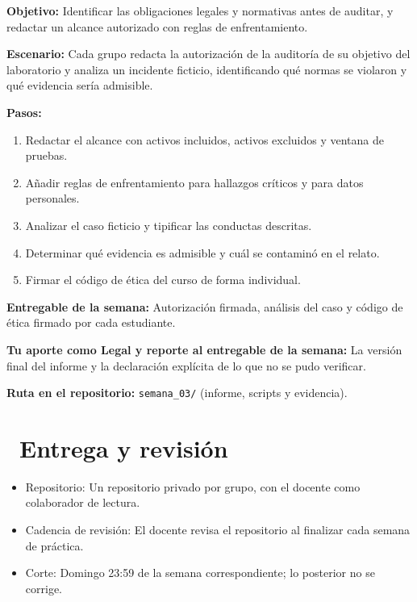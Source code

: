 \documentclass[11pt,a4paper]{article}
\newcommand{\iconotexto}[2]{\textcolor{cyanNeon}{\faIcon{#1}}~#2}
\begin{document}
\begin{tcolorbox}[cajaContenido,title={Semana 3 --- Carta de autorización y análisis de caso}]
\textbf{Objetivo:} Identificar las obligaciones legales y normativas antes de auditar, y redactar un alcance autorizado con reglas de enfrentamiento.

\textbf{Escenario:} Cada grupo redacta la autorización de la auditoría de su objetivo del laboratorio y analiza un incidente ficticio, identificando qué normas se violaron y qué evidencia sería admisible.


\textbf{Pasos:}
\begin{enumerate}[leftmargin=1.4em,itemsep=2pt,topsep=3pt]
  \item Redactar el alcance con activos incluidos, activos excluidos y ventana de pruebas.
  \item Añadir reglas de enfrentamiento para hallazgos críticos y para datos personales.
  \item Analizar el caso ficticio y tipificar las conductas descritas.
  \item Determinar qué evidencia es admisible y cuál se contaminó en el relato.
  \item Firmar el código de ética del curso de forma individual.
\end{enumerate}
\textbf{Entregable de la semana:} Autorización firmada, análisis del caso y código de ética firmado por cada estudiante.

\textbf{Tu aporte como Legal y reporte al entregable de la semana:} La versión final del informe y la declaración explícita de lo que no se pudo verificar.

\textbf{Ruta en el repositorio:} \texttt{semana\_03/} (informe, scripts y evidencia).
\end{tcolorbox}

\section{\iconotexto{code-branch}{Entrega y revisión}}

\begin{itemize}[leftmargin=1.4em,itemsep=2pt,topsep=3pt]
  \item Repositorio: Un repositorio privado por grupo, con el docente como colaborador de lectura.
  \item Cadencia de revisión: El docente revisa el repositorio al finalizar cada semana de práctica.
  \item Corte: Domingo 23:59 de la semana correspondiente; lo posterior no se corrige.
\end{itemize}
\end{document}
